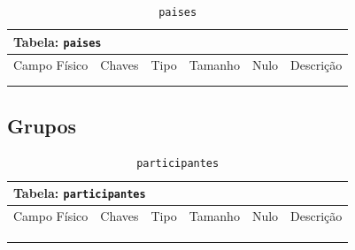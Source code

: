 \documentclass[12pt,a4paper]{article}
\begin{document}
\begin{center}
\begin{table}[h!]
	\caption{\texttt{paises}}
	\label{tabela:paises}
	\begin{tabular}{|p{2.5cm}|p{1cm}|p{1.25cm}|p{1.75cm}|p{1.25cm}|p{5cm}|}\hline	
		\multicolumn{6}{|p{16cm}|}{\cellcolor{cinzaClaro}  \centering Tabela: \texttt{paises}} \\ \hline %
		{\small Campo Físico}   & {\small Chaves} & {\small Tipo} & {\small Tamanho} & {\small Nulo} & {\small Descrição}\\\hline %
		
		{\tiny } & {\tiny } & {\tiny } & {\tiny } & {\tiny } &{\tiny }\\\hline
		{\tiny } & {\tiny } & {\tiny } & {\tiny } & {\tiny } &{\tiny }\\\hline
	
			
	\end{tabular}
\end{table}	
\end{center}

\subsection{Grupos}


\begin{center}
\begin{table}[h!]
	\caption{\texttt{participantes}}
	\label{tabela:participantes}
	\begin{tabular}{|p{2.5cm}|p{1cm}|p{1.25cm}|p{1.75cm}|p{1.25cm}|p{5cm}|}\hline	
		\multicolumn{6}{|p{16cm}|}{\cellcolor{cinzaClaro}  \centering Tabela: \texttt{participantes}} \\ \hline %
		{\small Campo Físico}   & {\small Chaves} & {\small Tipo} & {\small Tamanho} & {\small Nulo} & {\small Descrição}\\\hline %
		
		{\tiny } & {\tiny } & {\tiny } & {\tiny } & {\tiny } &{\tiny }\\\hline
		{\tiny } & {\tiny } & {\tiny } & {\tiny } & {\tiny } &{\tiny }\\\hline
		{\tiny } & {\tiny } & {\tiny } & {\tiny } & {\tiny } &{\tiny }\\\hline
			
	\end{tabular}
\end{table}	
\end{center}
\end{document}
